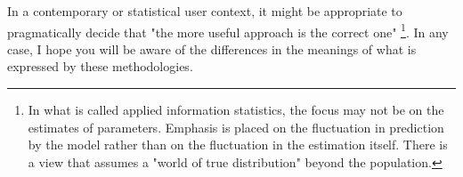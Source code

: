 \documentclass{ltjsarticle}
\begin{document}
In a contemporary or statistical user context, it might be appropriate to pragmatically decide that "the more useful approach is the correct one" \footnote{In what is called applied information statistics, the focus may not be on the estimates of parameters. Emphasis is placed on the fluctuation in prediction by the model rather than on the fluctuation in the estimation itself. There is a view that assumes a "world of true distribution" beyond the population.}. In any case, I hope you will be aware of the differences in the meanings of what is expressed by these methodologies.
\end{document}
